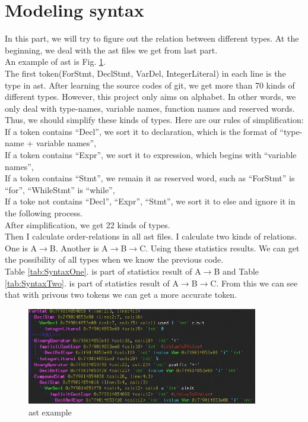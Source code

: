 \documentclass[prodmode,acmtecs]{acmsmall} %
\begin{document}
\section{Modeling syntax}
In this part, we will try to figure out the relation between different types. At the beginning, we deal with the ast files we get from last part.\\
An example of ast is Fig. \ref{fig:ast example}.\\
The first token(ForStmt, DeclStmt, VarDel, IntegerLiteral) in each line is the type in ast. After learning the source codes of git, we get more than 70 kinds of different types. However, this project only aims on alphabet. In other words, we only deal with type-names, variable names, function names and reserved words. Thus, we should simplify these kinds of types. 
Here are our rules of simplification:\\
If a token contains “Decl”, we sort it to declaration, which is the format of “type-name + variable names”, \\
If a token contains “Expr”, we sort it to expression, which begins with “variable names”,\\
If a token contains “Stmt”, we remain it as reserved word, such as “ForStmt” is “for”, “WhileStmt” is “while”,\\
If a toke not contains “Decl”, “Expr”, “Stmt”, we sort it to else and ignore it in the following process.\\
After simplification, we get 22 kinds of types.\\
Then I calculate order-relations in all ast files. I calculate two kinds of relations. One is A$\longrightarrow$B. Another is A$\longrightarrow$B$\longrightarrow$C. Using these statistics results. We can get the possibility of all types when we know the previous code. \\
Table \ref{tab:SyntaxOne}. is part of statistics result of A$\longrightarrow$B and Table \ref{tab:SyntaxTwo}. is part of statistics result of A$\longrightarrow$B$\longrightarrow$C. From this we can see that with privous two tokens we can get a more accurate token.\\

\begin{figure}
\centerline{\includegraphics[width=0.9\textwidth]{ast_example.jpg}}
\caption{ast example}
\label{fig:ast example}
\end{figure}
\end{document}
